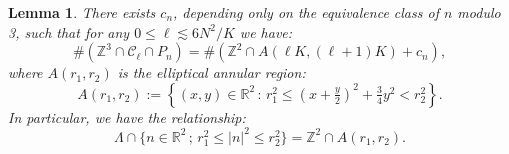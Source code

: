 \documentclass[12pt, letterpaper]{amsart}
\newtheorem{lemma}{Lemma}
\begin{document}
\begin{lemma}\label{Lemma: Lattice count reduction}
There exists $c_n$, depending only on the equivalence class of $n$ modulo 3, such that for any $0\leq \ell\lesssim 6N^2/K$ we have:
    \[
    \#(\mathbb{Z}^3\cap\mathcal{C}_\ell\cap P_n) = \#(\mathbb{Z}^2\cap A(\ell K, (\ell+1)K) + c_n),
    \]
    where $A(r_1, r_2)$ is the elliptical annular region:
    \[
    A(r_1, r_2) := \left\{ (x,y)\in\mathbb{R}^2\,:\,r_1^2\leq (x+\tfrac{y}{2})^2+\tfrac{3}{4}y^2 < r_2^2\right\}.
    \]
    In particular, we have the relationship:
    \[
    \Lambda\cap \{n\in\mathbb{R}^2\,;\, r_1^2 \leq |n|^2\leq r_2^2\} = \mathbb{Z}^2 \cap A(r_1, r_2).
    \]
\end{lemma}
\end{document}
